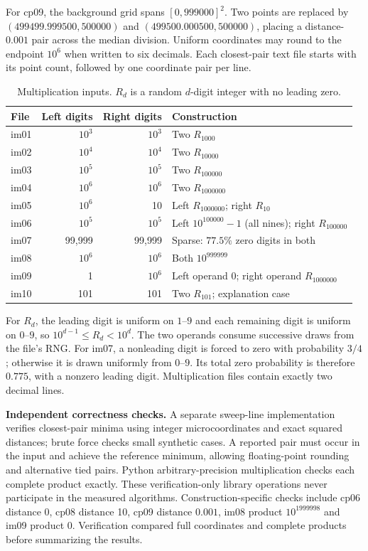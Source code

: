\documentclass[10pt,a4paper,twocolumn]{article}
\begin{document}
For cp09, the background grid spans $[0,999000]^2$. Two points are replaced by $(499499.999500,500000)$ and $(499500.000500,500000)$, placing a distance-$0.001$ pair across the median division. Uniform coordinates may round to the endpoint $10^6$ when written to six decimals. Each closest-pair text file starts with its point count, followed by one coordinate pair per line.

\begin{table}[ht]
\caption{Multiplication inputs. $R_d$ is a random $d$-digit integer with no leading zero.}
\label{tab:imdata}
\small
\begin{tabularx}{\columnwidth}{@{}lrrY@{}}
\toprule
File & Left digits & Right digits & Construction\\
\midrule
im01 & $10^3$ & $10^3$ & Two $R_{1000}$\\
im02 & $10^4$ & $10^4$ & Two $R_{10000}$\\
im03 & $10^5$ & $10^5$ & Two $R_{100000}$\\
im04 & $10^6$ & $10^6$ & Two $R_{1000000}$\\
im05 & $10^6$ & 10 & Left $R_{1000000}$; right $R_{10}$\\
im06 & $10^5$ & $10^5$ & Left $10^{100000}-1$ (all nines); right $R_{100000}$\\
im07 & 99,999 & 99,999 & Sparse: $77.5\%$ zero digits in both\\
im08 & $10^6$ & $10^6$ & Both $10^{999999}$\\
im09 & 1 & $10^6$ & Left operand $0$; right operand $R_{1000000}$\\
im10 & 101 & 101 & Two $R_{101}$; explanation case\\
\bottomrule
\end{tabularx}
\end{table}

For $R_d$, the leading digit is uniform on $1$--$9$ and each remaining digit is uniform on $0$--$9$, so $10^{d-1}\le R_d<10^d$. The two operands consume successive draws from the file's RNG. For im07, a nonleading digit is forced to zero with probability $3/4$; otherwise it is drawn uniformly from $0$--$9$. Its total zero probability is therefore $0.775$, with a nonzero leading digit. Multiplication files contain exactly two decimal lines.

\textbf{Independent correctness checks.} A separate sweep-line implementation verifies closest-pair minima using integer microcoordinates and exact squared distances; brute force checks small synthetic cases. A reported pair must occur in the input and achieve the reference minimum, allowing floating-point rounding and alternative tied pairs. Python arbitrary-precision multiplication checks each complete product exactly. These verification-only library operations never participate in the measured algorithms. Construction-specific checks include cp06 distance 0, cp08 distance 10, cp09 distance $0.001$, im08 product $10^{1999998}$ and im09 product 0. Verification compared full coordinates and complete products before summarizing the results.
\end{document}
